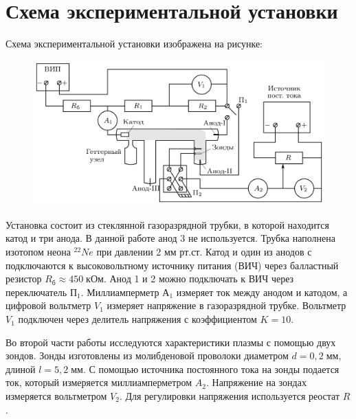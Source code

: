 \section*{Схема экспериментальной установки}

Схема экспериментальной установки изображена на рисунке:

\begin{figure}[H]
	\centering
	\includegraphics[width=1\textwidth]{../res/exp scheme.png}
\end{figure}

Установка состоит из стеклянной газоразрядной трубки, в которой находится катод и три анода. В данной работе анод 3 не используется. Трубка наполнена изотопом неона $^{22}Ne$ при давлении 2 мм рт.ст. Катод и один из анодов с подключаются к высоковольтному источнику питания (ВИЧ) через балластный резистор $R_б \approx 450 \; кОм$. Анод 1 и 2 можно подключать к ВИЧ через переключатель $П_1$. Миллиамперметр $А_1$ измеряет ток между анодом и катодом, а цифровой вольтметр $V_1$ измеряет напряжение в газоразрядной трубке. Вольтметр $V_1$ подключен через делитель напряжения с коэффициентом $K = 10$. 

Во второй части работы исследуются характеристики плазмы с помощью двух зондов. Зонды изготовлены из молибденовой проволоки диаметром $d = 0,2 \; мм$, длиной $l = 5,2 \; мм$. С помощью источника постоянного тока на зонды подается ток, который измеряется миллиамперметром $A_2$. Напряжение на зондах измеряется вольтметром $V_2$. Для регулировки напряжения используется реостат $R$.

